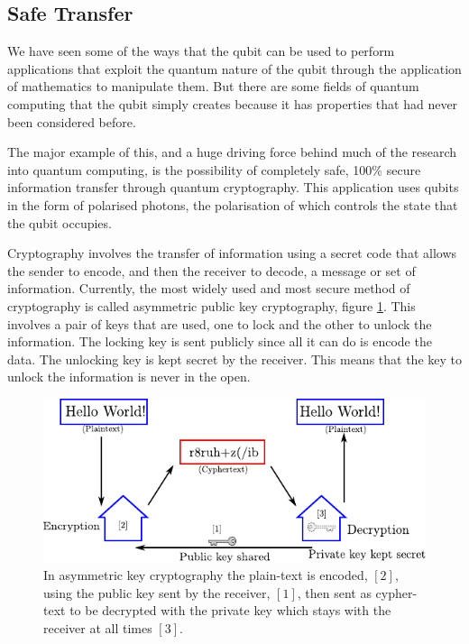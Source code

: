 \subsection{Safe Transfer}
\label{sec:safe_transfer}
We have seen some of the ways that the qubit can be used to perform applications that exploit the quantum nature of the qubit through the application of mathematics to manipulate them. But there are some fields of quantum computing that the qubit simply creates because it has properties that had never been considered before.

The major example of this, and a huge driving force behind much of the research into quantum computing, is the possibility of completely safe, 100\% secure information transfer through quantum cryptography. This application uses qubits in the form of polarised photons, the polarisation of which controls the state that the qubit occupies.

Cryptography involves the transfer of information using a secret code that allows the sender to encode, and then the receiver to decode, a message or set of information. Currently, the most widely used and most secure method of cryptography is called asymmetric public key cryptography, figure \ref{fig:asymmetric-key}. This involves a pair of keys that are used, one to lock and the other to unlock the information. The locking key is sent publicly since all it can do is encode the data. The unlocking key is kept secret by the receiver. This means that the key to unlock the information is never in the open.
\begin{figure}[ht]
	\centering
	\includegraphics{asymmetrickey.pdf}
	\caption{In asymmetric key cryptography the plain-text is encoded, $[2]$, using the public key sent by the receiver, $[1]$, then sent as cypher-text to be decrypted with the private key which stays with the receiver at all times $[3]$.\label{fig:asymmetric-key}}
\end{figure}

